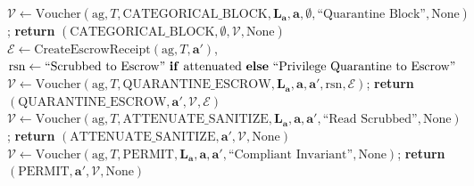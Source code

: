 \documentclass[conference,10pt]{IEEEtran}
\begin{document}
\begin{algorithm*}[!t]
\begin{algorithmic}[1]
    \ENDIF
\ENDIF
{}
            \STATE $\mathcal{V} \leftarrow \text{Voucher}(\text{ag}, T, \text{CATEGORICAL\_BLOCK}, \mathbf{L}_{\mathbf{a}}, \mathbf{a}, \emptyset, \text{``Quarantine Block''}, \text{None})$; \quad \textbf{return} $(\text{CATEGORICAL\_BLOCK}, \emptyset, \mathcal{V}, \text{None})$
        \ENDIF
        \STATE $\mathcal{E} \leftarrow \text{CreateEscrowReceipt}(\text{ag}, T, \mathbf{a}')$, \quad $\text{rsn} \leftarrow \text{``Scrubbed to Escrow''} \text{ \textbf{if} } \text{attenuated} \text{ \textbf{else} } \text{``Privilege Quarantine to Escrow''}$
        \STATE $\mathcal{V} \leftarrow \text{Voucher}(\text{ag}, T, \text{QUARANTINE\_ESCROW}, \mathbf{L}_{\mathbf{a}}, \mathbf{a}, \mathbf{a}', \text{rsn}, \mathcal{E})$; \quad \textbf{return} $(\text{QUARANTINE\_ESCROW}, \mathbf{a}', \mathcal{V}, \mathcal{E})$
    \ELSE
        \STATE $\mathcal{V} \leftarrow \text{Voucher}(\text{ag}, T, \text{ATTENUATE\_SANITIZE}, \mathbf{L}_{\mathbf{a}}, \mathbf{a}, \mathbf{a}', \text{``Read Scrubbed''}, \text{None})$; \quad \textbf{return} $(\text{ATTENUATE\_SANITIZE}, \mathbf{a}', \mathcal{V}, \text{None})$
    \ENDIF
\ENDIF
\STATE $\mathcal{V} \leftarrow \text{Voucher}(\text{ag}, T, \text{PERMIT}, \mathbf{L}_{\mathbf{a}}, \mathbf{a}, \mathbf{a}', \text{``Compliant Invariant''}, \text{None})$; \quad \textbf{return} $(\text{PERMIT}, \mathbf{a}', \mathcal{V}, \text{None})$
\end{algorithmic}
\end{algorithm*}
\end{document}
